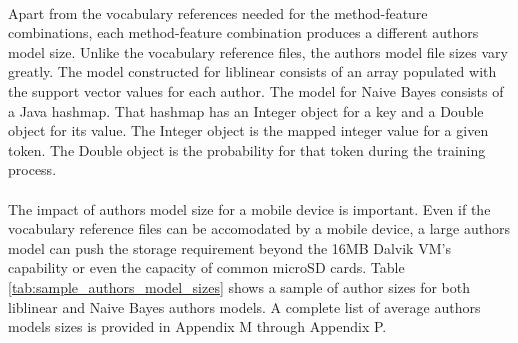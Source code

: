 	\paragraph*{} Apart from the vocabulary references needed for the method-feature combinations, each method-feature combination produces a different authors model size.  Unlike the vocabulary reference files, the authors model file sizes vary greatly.  The model constructed for liblinear consists of an array populated with the support vector values for each author.  The model for Naive Bayes consists of a Java hashmap.  That hashmap has an Integer object for a key and a Double object for its value.  The Integer object is the mapped integer value for a given token.  The Double object is the probability for that token during the training process.
	
	\paragraph*{} The impact of authors model size for a mobile device is important. Even if the vocabulary reference files can be accomodated by a mobile device, a large authors model can push the storage requirement beyond the 16MB Dalvik VM's capability or even the capacity of common microSD cards.  Table \ref{tab:sample_authors_model_sizes} shows a sample of author sizes for both liblinear and Naive Bayes authors models.  A complete list of average authors models sizes is provided in Appendix M through Appendix P.
	

